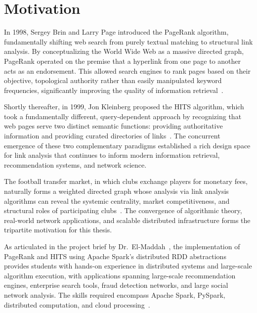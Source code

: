 \section{Motivation}
\label{sec:motivation}

In 1998, Sergey Brin and Larry Page introduced the PageRank algorithm, fundamentally shifting web search from purely textual matching to structural link analysis. By conceptualizing the World Wide Web as a massive directed graph, PageRank operated on the premise that a hyperlink from one page to another acts as an endorsement. This allowed search engines to rank pages based on their objective, topological authority rather than easily manipulated keyword frequencies, significantly improving the quality of information retrieval~\cite{brin1998pagerank}.

Shortly thereafter, in 1999, Jon Kleinberg proposed the HITS algorithm, which took a fundamentally different, query-dependent approach by recognizing that web pages serve two distinct semantic functions: providing authoritative information and providing curated directories of links~\cite{kleinberg1999hits}. The concurrent emergence of these two complementary paradigms established a rich design space for link analysis that continues to inform modern information retrieval, recommendation systems, and network science.

The football transfer market, in which clubs exchange players for monetary fees, naturally forms a weighted directed graph whose analysis via link analysis algorithms can reveal the systemic centrality, market competitiveness, and structural roles of participating clubs~\cite{liu2014football, ieice2016football}. The convergence of algorithmic theory, real-world network applications, and scalable distributed infrastructure forms the tripartite motivation for this thesis.

As articulated in the project brief by Dr.\ El-Maddah~\cite{elmaddah_project}, the implementation of PageRank and HITS using Apache Spark's distributed RDD abstractions provides students with hands-on experience in distributed systems and large-scale algorithm execution, with applications spanning large-scale recommendation engines, enterprise search tools, fraud detection networks, and large social network analysis. The skills required encompass Apache Spark, PySpark, distributed computation, and cloud processing~\cite{elmaddah_project}.


